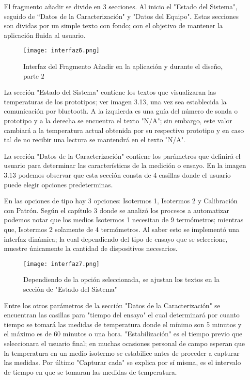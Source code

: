 \par \noindent
El fragmento añadir se divide en 3 secciones. Al inicio el "Estado del Sistema", seguido de “Datos de la Caracterización" y "Datos del Equipo". Estas secciones son dividas por un simple texto con fondo; con el objetivo de mantener la aplicación fluida al usuario.

\begin{figure}[H]
	\centering
	\texttt{[image: interfaz6.png]}
	\caption{Interfaz del Fragmento Añadir en la aplicación y durante el diseño, parte 2}
\end{figure}

\par \noindent
La sección "Estado del Sistema" contiene los textos que visualizaran las temperaturas de los prototipos; ver imagen 3.13, una vez sea establecida la comunicación por bluetooth. A la izquierda es una guía del número de sonda o prototipo y a la derecha se encuentra el texto "N/A"; sin embargo, este valor cambiará a la temperatura actual obtenida por su respectivo prototipo y en caso tal de no recibir una lectura se mantendrá en el texto "N/A".

\par \noindent
La sección "Datos de la Caracterización" contiene los parámetros que definirá el usuario para determinar las características de la medición o ensayo. En la imagen 3.13 podemos observar que esta sección consta de 4 casillas donde el usuario puede elegir opciones predeterminas.

\par \noindent
En las opciones de tipo hay 3 opciones: Isotermos 1, Isotermos 2 y Calibración con Patrón. Según el capítulo 3 donde se analizó los procesos a automatizar podemos notar que los medios Isotermos 1 necesitan de 9 termómetros; mientras que, Isotermos 2 solamente de 4 termómetros. Al saber esto se implementó una interfaz dinámica; la cual dependiendo del tipo de ensayo que se seleccione, muestre únicamente la cantidad de dispositivos necesarios. 

\begin{figure}[H]
	\centering
	\texttt{[image: interfaz7.png]}
	\caption{Dependiendo de la opción seleccionada, se ajustan los textos en la sección de "Estado del Sistema"}
\end{figure}

\par \noindent
Entre los otros parámetros de la sección "Datos de la Caracterización" se encuentran las casillas para "tiempo del ensayo" el cual determinará por cuanto tiempo se tomará las medidas de temperatura donde el mínimo son 5 minutos y el máximo es de 60 minutos o una hora. "Estabilización" es el tiempo previo que seleccionara el usuario final; en muchas ocasiones personal de campo esperan que la temperatura en un medio isotermo se estabilice antes de proceder a capturar las medidas. Por último "Capturar cada" se explica por sí misma, es el intervalo de tiempo en que se tomaran las medidas de temperatura.

